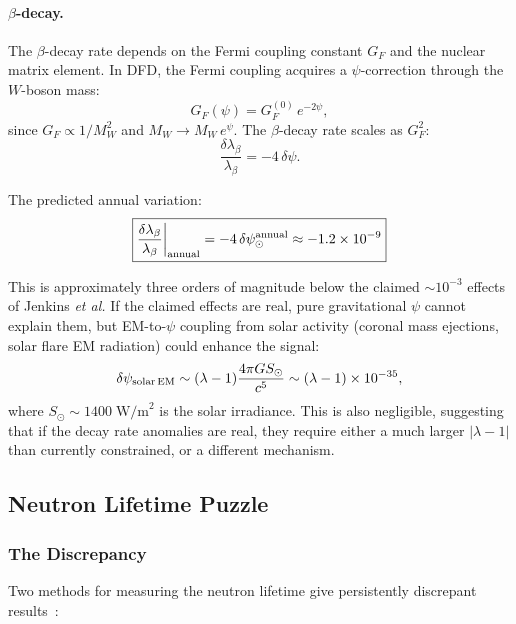 \documentclass[aps,prb,twocolumn,superscriptaddress,floatfix,nofootinbib,longbibliography]{revtex4-2}
\begin{document}
\paragraph{$\beta$-decay.}
The $\beta$-decay rate depends on the Fermi coupling constant $G_F$ and
the nuclear matrix element.  In DFD, the Fermi coupling acquires a
$\psi$-correction through the $W$-boson mass:
\begin{equation}
G_F(\psi) = G_F^{(0)}\,e^{-2\psi},
\label{eq:GF-psi}
\end{equation}
since $G_F \propto 1/M_W^2$ and $M_W \to M_W\,e^{\psi}$.  The
$\beta$-decay rate scales as $G_F^2$:
\begin{equation}
\frac{\delta\lambda_\beta}{\lambda_\beta} = -4\,\delta\psi.
\label{eq:beta-shift}
\end{equation}

The predicted annual variation:
\begin{equation}
\boxed{
\frac{\delta\lambda_\beta}{\lambda_\beta}\bigg|_{\rm annual}
= -4\,\delta\psi_\odot^{\rm annual} \approx -1.2 \times 10^{-9}
}
\label{eq:beta-annual}
\end{equation}

This is approximately three orders of magnitude below the claimed
$\sim 10^{-3}$ effects of Jenkins \textit{et al.}  If the claimed effects
are real, pure gravitational $\psi$ cannot explain them, but
EM-to-$\psi$ coupling from solar activity (coronal mass ejections,
solar flare EM radiation) could enhance the signal:
\begin{equation}
\delta\psi_{\rm solar\,EM} \sim (\lambda - 1)\frac{4\pi G S_\odot}{c^5}
\sim (\lambda - 1) \times 10^{-35},
\label{eq:solar-em}
\end{equation}
where $S_\odot \sim 1400\;\text{W/m}^2$ is the solar irradiance.  This
is also negligible, suggesting that if the decay rate anomalies are real,
they require either a much larger $|\lambda - 1|$ than currently
constrained, or a different mechanism.

\subsection{Neutron Lifetime Puzzle}

\subsubsection{The Discrepancy}

Two methods for measuring the neutron lifetime give persistently
discrepant results~\cite{Wietfeldt2011,Pattie2018,UCNtau2021}:
\end{document}
